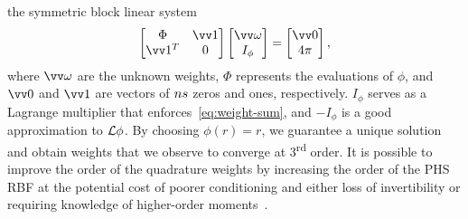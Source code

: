the symmetric block linear system
\begin{equation}\label{eq:rbf-quadrature}
    \begin{bmatrix}
            \Phi & \arr{1} \\ \arr{1}^T & 0
    \end{bmatrix}\begin{bmatrix}
            \arr{\omega} \\ I_\phi
    \end{bmatrix} = \begin{bmatrix}
            \arr{0} \\ 4\pi
    \end{bmatrix},
\end{equation}
where $\arr{\omega}$ are the unknown weights, $\Phi$ represents the evaluations of $\phi$, and $\arr{0}$ and
$\arr{1}$ are vectors of $\sample\cardinality$ zeros and ones, respectively. $I_{\phi}$ serves as a Lagrange
multiplier that enforces~\eqref{eq:weight-sum}, and $-I_\phi$ is a good approximation to $\mathcal{L}\phi$. By choosing
$\phi(r) = r$, we guarantee a unique solution and obtain weights that we observe to converge at
3\textsuperscript{rd} order. It is possible to improve the order of the quadrature weights by increasing the order
of the PHS RBF at the potential cost of poorer conditioning and either loss of invertibility or requiring
knowledge of higher-order moments~\cite{Fuselier:2013coba}.

